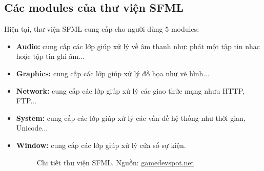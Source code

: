 \subsection{Các modules của thư viện SFML}
Hiện tại, thư viện SFML cung cấp cho người dùng $5$ modules:
\begin{itemize}
\item \textbf{Audio:} cung cấp các lớp giúp xử lý về âm thanh như: phát một tập tin nhạc hoặc tập tin ghi âm...
\item \textbf{Graphics:} cung cấp các lớp giúp xử lý đồ họa như vẽ hình...
\item \textbf{Network:} cung cấp các lớp giúp xử lý các giao thức mạng nhưu HTTP, FTP...
\item \textbf{System:} cung cấp các lớp giúp xử lý các vấn đề hệ thống như thời gian, Unicode...
\item \textbf{Window:} cung cấp các lớp giúp xử lý cửa sổ sự kiện.
\begin{figure}[H]
\caption{Chi tiết thư viện SFML. Nguồn: \url{gamedevspot.net}}
\end{figure}
\end{itemize}
